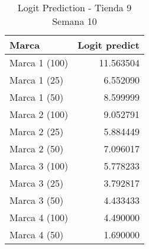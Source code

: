 \begin{table}
\centering
\caption{Logit Prediction - Tienda 9 Semana 10}
\begin{tabular}{lr}
\toprule
         Marca &  Logit predict \\
\midrule
 Marca 1 (100) &      11.563504 \\
  Marca 1 (25) &       6.552090 \\
  Marca 1 (50) &       8.599999 \\
 Marca 2 (100) &       9.052791 \\
  Marca 2 (25) &       5.884449 \\
  Marca 2 (50) &       7.096017 \\
 Marca 3 (100) &       5.778233 \\
  Marca 3 (25) &       3.792817 \\
  Marca 3 (50) &       4.433433 \\
 Marca 4 (100) &       4.490000 \\
  Marca 4 (50) &       1.690000 \\
\bottomrule
\end{tabular}
\end{table}
